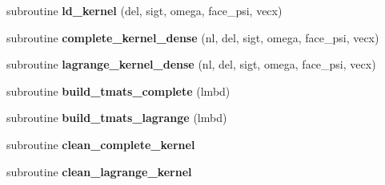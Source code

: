 \begin{DoxyCompactItemize}
\item 
\hypertarget{classdgfem__kernel__module_ab2895739fbca15c13bfc209f2a9f56c1}{subroutine {\bfseries ld\-\_\-kernel} (del, sigt, omega, face\-\_\-psi, vecx)}\label{classdgfem__kernel__module_ab2895739fbca15c13bfc209f2a9f56c1}

\item 
\hypertarget{classdgfem__kernel__module_ae9af8c276042e07c95df3223a2efba18}{subroutine {\bfseries complete\-\_\-kernel\-\_\-dense} (nl, del, sigt, omega, face\-\_\-psi, vecx)}\label{classdgfem__kernel__module_ae9af8c276042e07c95df3223a2efba18}

\item 
\hypertarget{classdgfem__kernel__module_a695419069631a5882cef0dd9320ef81b}{subroutine {\bfseries lagrange\-\_\-kernel\-\_\-dense} (nl, del, sigt, omega, face\-\_\-psi, vecx)}\label{classdgfem__kernel__module_a695419069631a5882cef0dd9320ef81b}

\item 
\hypertarget{classdgfem__kernel__module_ae8f2982412ffa7c942882499aee04ffd}{subroutine {\bfseries build\-\_\-tmats\-\_\-complete} (lmbd)}\label{classdgfem__kernel__module_ae8f2982412ffa7c942882499aee04ffd}

\item 
\hypertarget{classdgfem__kernel__module_a5c329bf38a7b02608a8bbc8daba555ca}{subroutine {\bfseries build\-\_\-tmats\-\_\-lagrange} (lmbd)}\label{classdgfem__kernel__module_a5c329bf38a7b02608a8bbc8daba555ca}

\item 
\hypertarget{classdgfem__kernel__module_a9dd092be0f5af7f7456a89a064dc8efe}{subroutine {\bfseries clean\-\_\-complete\-\_\-kernel}}\label{classdgfem__kernel__module_a9dd092be0f5af7f7456a89a064dc8efe}

\item 
\hypertarget{classdgfem__kernel__module_a4cc0ad331dffcc26358eeb4a99ab36ac}{subroutine {\bfseries clean\-\_\-lagrange\-\_\-kernel}}\label{classdgfem__kernel__module_a4cc0ad331dffcc26358eeb4a99ab36ac}

\end{DoxyCompactItemize}
